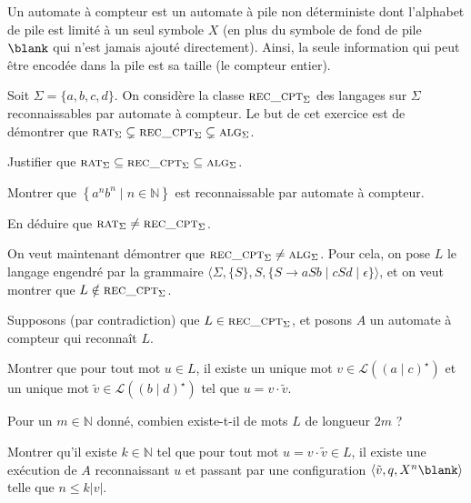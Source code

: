 
\begingroup

\begin{exercice}\label{exo:parsing/rational/challenge}

  Un automate à compteur est un automate à pile non déterministe dont l'alphabet de pile est limité à un seul
  symbole $X$  (en plus du symbole de fond de pile $\blank$ qui n'est jamais ajouté directement). Ainsi, la
  seule information qui peut être encodée dans la pile est sa taille (le compteur entier).
    
  Soit $\Sigma = \{a, b, c, d\}$. On considère la classe $\textsc{rec\_cpt}_\Sigma$ des langages
  sur $\Sigma$ reconnaissables par automate à compteur. Le but de cet exercice est de démontrer que
  $\textsc{rat}_\Sigma \subsetneq \textsc{rec\_cpt}_\Sigma \subsetneq \textsc{alg}_\Sigma$. 

  \begin{questions}
  \item Justifier que $\textsc{rat}_\Sigma \subseteq \textsc{rec\_cpt}_\Sigma \subseteq \textsc{alg}_\Sigma$. 
  \item Montrer que $\left\{ a^n b^n \mid n \in \mathbb{N} \right\}$ est reconnaissable par automate à compteur.
  \item En déduire que $\textsc{rat}_\Sigma \neq \textsc{rec\_cpt}_\Sigma$. 
  \end{questions}

  On veut maintenant démontrer que $\textsc{rec\_cpt}_\Sigma \neq \textsc{alg}_\Sigma$.
  Pour cela, on pose $L$ le langage engendré par la grammaire $\langle \Sigma, \{S\}, S, \{ S \rightarrow a S b \mid c S d \mid \epsilon \} \rangle$,
  et on veut montrer que $L \notin \textsc{rec\_cpt}_\Sigma$.

  Supposons (par contradiction) que $L \in \textsc{rec\_cpt}_\Sigma$, et posons $A$ un automate à compteur qui reconnaît $L$. 
  \begin{questions}
  \item Montrer que pour tout mot $u \in L$, il existe un unique mot $v \in \mathcal{L}((a\mid c)^\star)$
    et un unique mot $\tilde{v} \in \mathcal{L}((b\mid d)^\star)$ tel que $u = v \cdot \tilde{v}$.
  \item Pour un $m \in \mathbb{N}$ donné, combien existe-t-il de mots $L$ de longueur $2m$ ? 
  \item Montrer qu'il existe $k \in \mathbb{N}$ tel que pour tout mot $u = v \cdot \tilde{v} \in L$,
    il existe une exécution de $A$ reconnaissant $u$ et passant par une configuration $\langle \tilde{v}, q, X^n\blank \rangle$
    telle que $n \le k |v|$. 
    

\end{questions}
\end{exercice}

